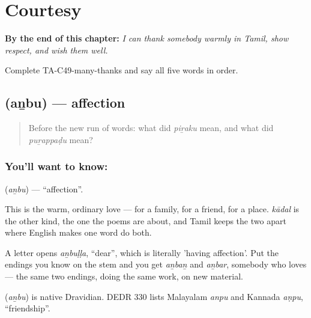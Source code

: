 
\chapter{Courtesy}
\label{ch:ta-courtesy}

\begin{chapteropening}
\textbf{By the end of this chapter:} \emph{I can thank somebody warmly in Tamil, show respect, and wish them well.}

Complete TA-C49-many-thanks and say all five words in order.
\end{chapteropening}

\section[\texorpdfstring{\ta{அன்பு} (aṉbu)}{அன்பு (aṉbu)}]{ (aṉbu) — affection}

\label{lesson:TA-C49-affection}



\begin{quote}
Before the new run of words: what did \emph{piṟaku} mean, and what did \emph{puṟappaḍu} mean?
\end{quote}

\subsection*{You'll want to know: }
\textbf{} (\emph{aṉbu}) — \textquotedblleft{}affection\textquotedblright{}.

This is the warm, ordinary love — for a family, for a friend, for a place. \emph{kādal} is the other kind, the one the poems are about, and Tamil keeps the two apart where English makes one word do both.

A letter opens \emph{aṉbuḷḷa}, \textquotedblleft{}dear\textquotedblright{}, which is literally 'having affection'. Put the endings you know on the stem and you get \emph{aṉbaṉ} and \emph{aṉbar}, somebody who loves — the same two endings, doing the same work, on new material.

\begin{cousinweb}
\textbf{} (\emph{aṉbu}) is native Dravidian. DEDR 330 lists Malayalam \emph{anpu} and Kannada \emph{aṇpu}, \textquotedblleft{}friendship\textquotedblright{}.
\end{cousinweb}

